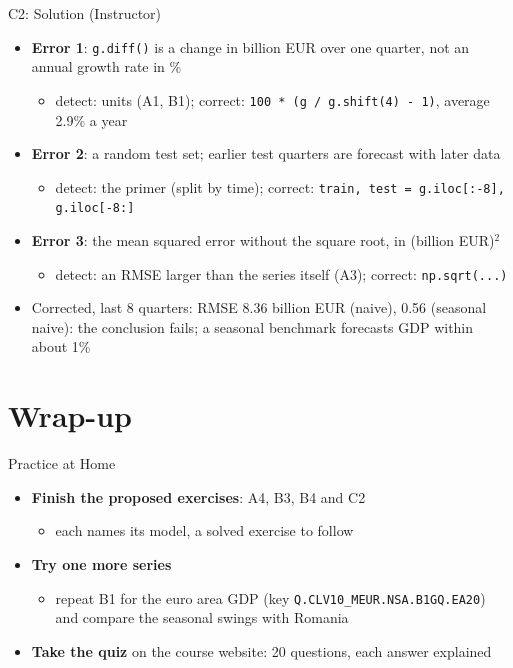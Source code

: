 \ifsolutions
\begin{frame}{C2: Solution (Instructor)}
\itemsize{\footnotesize}
\begin{itemize}
    \item \textbf{Error 1}: \texttt{g.diff()} is a change in billion EUR over one quarter, not an annual growth rate in \%
    \begin{itemize}
        \item detect: units (A1, B1); correct: \texttt{100 * (g / g.shift(4) - 1)}, average 2.9\% a year
    \end{itemize}
    \item \textbf{Error 2}: a random test set; earlier test quarters are forecast with later data
    \begin{itemize}
        \item detect: the primer (split by time); correct: \texttt{train, test = g.iloc[:-8], g.iloc[-8:]}
    \end{itemize}
    \item \textbf{Error 3}: the mean squared error without the square root, in (billion EUR)$^2$
    \begin{itemize}
        \item detect: an RMSE larger than the series itself (A3); correct: \texttt{np.sqrt(...)}
    \end{itemize}
    \item Corrected, last 8 quarters: RMSE 8.36 billion EUR (naive), 0.56 (seasonal naive): the conclusion fails; a seasonal benchmark forecasts GDP within about 1\%
\end{itemize}
\end{frame}
\fi


\section{Wrap-up}

\begin{frame}{Practice at Home}
\itemsize{\small}
\begin{itemize}
    \item \textbf{Finish the proposed exercises}: A4, B3, B4 and C2
    \begin{itemize}
        \item each names its model, a solved exercise to follow
    \end{itemize}
    \item \textbf{Try one more series}
    \begin{itemize}
        \item repeat B1 for the euro area GDP (key \texttt{Q.CLV10\_MEUR.NSA.B1GQ.EA20}) and compare the seasonal swings with Romania
    \end{itemize}
    \item \textbf{Take the  quiz} on the course website: 20 questions, each answer explained
\end{itemize}
\end{frame}

